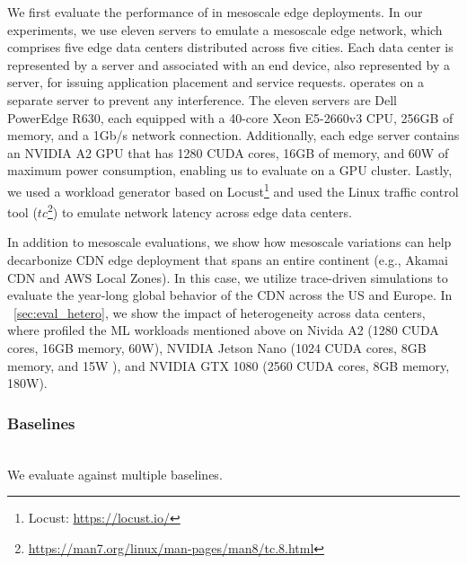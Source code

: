  We first evaluate the performance of \proposedsystem in mesoscale edge deployments. In our experiments, we use eleven servers to emulate a mesoscale edge network, which comprises five edge data centers distributed across five cities. Each data center is represented by a server and associated with an end device, also represented by a server, for issuing application placement and service requests. \proposedsystem operates on a separate server to prevent any interference. The eleven servers are Dell PowerEdge R630, each equipped with a 40-core Xeon E5-2660v3 CPU, 256GB of memory, and a 1Gb/s network connection. Additionally, each edge server contains an NVIDIA A2 GPU that has 1280 CUDA cores, 16GB of memory, and 60W of maximum power consumption, enabling us to evaluate \proposedsystem on a GPU cluster. Lastly, we used a workload generator based on Locust\footnote{Locust: \url{https://locust.io/}} and used the Linux traffic control tool ($tc$\footnote{ \url{https://man7.org/linux/man-pages/man8/tc.8.html}}) to emulate network latency across edge data centers.


In addition to mesoscale evaluations, we show how mesoscale variations can help decarbonize CDN edge deployment that spans an entire continent (e.g., Akamai CDN and AWS Local Zones). In this case, we utilize trace-driven simulations to evaluate the year-long global behavior of the CDN across the US and Europe.
In ~\autoref{sec:eval_hetero}, we show the impact of heterogeneity across data centers, where profiled the ML workloads mentioned above on Nivida A2 (1280 CUDA cores, 16GB memory, 60W), NVIDIA Jetson Nano (1024 CUDA cores, 8GB memory, and 15W ), and NVIDIA GTX 1080 (2560 CUDA cores, 8GB memory, 180W).   %






\subsubsection{Baselines} \hfill\\
We evaluate \proposedsystem against multiple baselines.

